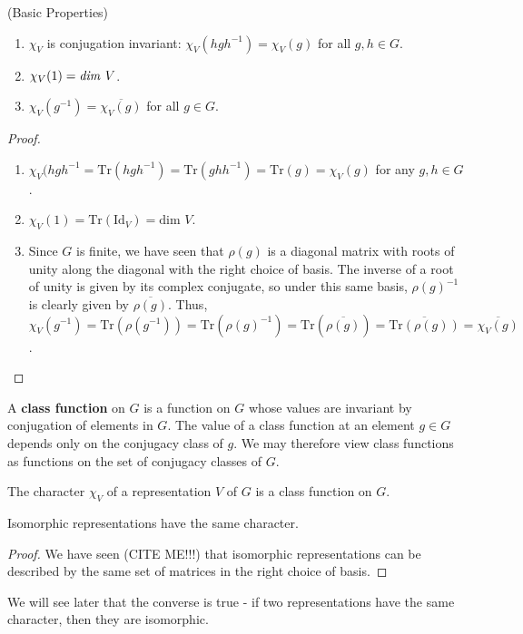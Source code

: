 \begin{prop} (Basic Properties)
\begin{enumerate}
\item $\chi_V$ is conjugation invariant: $\chi_V (h g h^{-1}) = \chi_V (g)$ for all $g , h \in G$.
\item $\chi_V (1) = \text{\emph{dim }} V$.
\item $\chi_V (g^{-1}) = \overline{\chi_V (g)}$ for all $g \in G$.
\end{enumerate}
\end{prop}

\begin{proof}
\begin{enumerate}
\item $\chi_V (h g h^{-1} = \text{Tr}(h g h^{-1}) = \text{Tr}(g h h^{-1}) = \text{Tr} (g) = \chi_V(g)$ for any $g,h \in G$.
\item $\chi_V(1) = \text{Tr}(\text{Id} _V) = \text{dim } V$.
\item Since $G$ is finite, we have seen that $\rho(g)$ is a diagonal matrix with roots of unity along the diagonal with the right choice of basis.  The inverse of a root of unity is given by its complex conjugate, so under this same basis, $\rho(g)^{-1}$ is clearly given by $\overline{\rho(g)}$.  Thus, $\chi_V(g^{-1}) = \text{Tr}(\rho(g^{-1})) = \text{Tr}(\rho(g)^{-1}) = \text{Tr}(\overline{\rho(g)}) = \overline{ \text{Tr} (\rho(g))} = \overline {\chi_V(g)}$.
\end{enumerate}
\end{proof}

\begin{defn}
A \textbf{class function} on $G$ is a function on $G$ whose values are invariant by conjugation of elements in $G$.  The value of a class function at an element $g \in G$ depends only on the conjugacy class of $g$.  We may therefore view class functions as functions on the set of conjugacy classes of $G$.
\end{defn}
\begin{note}
The character $\chi_V$ of a representation $V$ of $G$ is a class function on $G$.
\end{note}

\begin{prop}
Isomorphic representations have the same character.
\end{prop}
\begin{proof}
We have seen (CITE ME!!!) that isomorphic representations can be described by the same set of matrices in the right choice of basis.
\end{proof}
We will see later that the converse is true - if two representations have the same character, then they are isomorphic.

